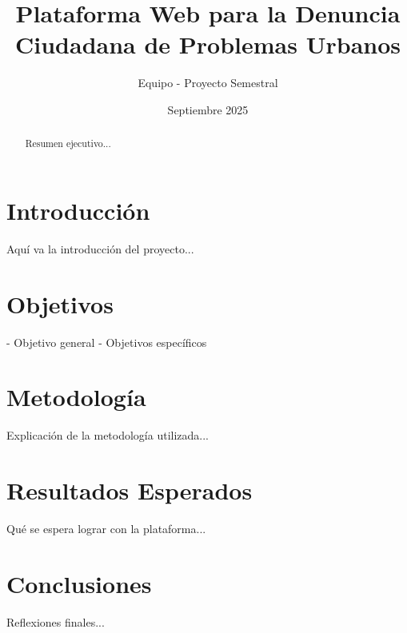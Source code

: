 \documentclass[a4paper,12pt]{article}
\title{Plataforma Web para la Denuncia Ciudadana de Problemas Urbanos}
\author{Equipo - Proyecto Semestral}
\date{Septiembre 2025}
\begin{document}
\maketitle

\begin{abstract}
Resumen ejecutivo...
\end{abstract}

\section{Introducción}
Aquí va la introducción del proyecto...

\section{Objetivos}
- Objetivo general  
- Objetivos específicos  

\section{Metodología}
Explicación de la metodología utilizada...

\section{Resultados Esperados}
Qué se espera lograr con la plataforma...

\section{Conclusiones}
Reflexiones finales...
\end{document}
